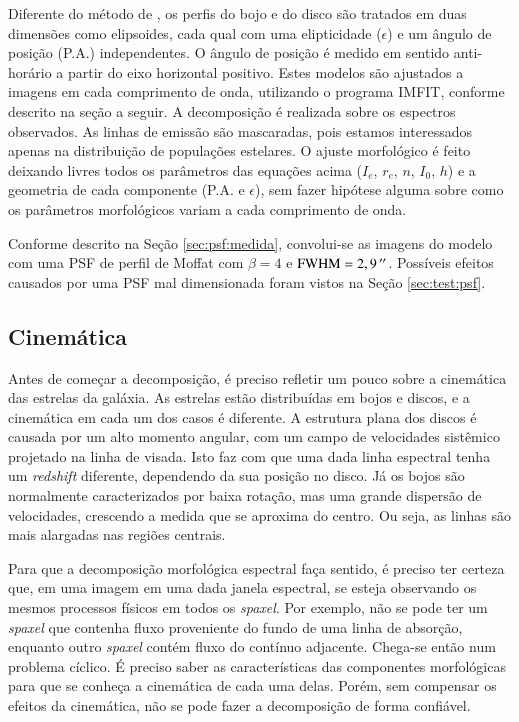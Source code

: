 Diferente do método de \citeauthor{Johnston2012}, os perfis do bojo e do disco
são tratados em duas dimensões como elipsoides, cada qual com uma elipticidade
($\epsilon$) e um ângulo de posição (P.A.) independentes. O ângulo de posição é
medido em sentido anti-horário a partir do eixo horizontal positivo. Estes
modelos são ajustados a imagens em cada comprimento de onda, utilizando o
programa IMFIT, conforme descrito na seção a seguir. A decomposição é realizada
sobre os espectros observados. As linhas de emissão são mascaradas, pois estamos
interessados apenas na distribuição de populações estelares.
O ajuste morfológico é feito deixando livres todos os parâmetros das equações
acima ($I_e$, $r_e$, $n$, $I_0$, $h$) e a geometria de cada componente (P.A. e
$\epsilon$), sem fazer hipótese alguma sobre como os parâmetros morfológicos
variam a cada comprimento de onda.

Conforme descrito na Seção \ref{sec:psf:medida}, convolui-se as imagens do
modelo com uma PSF de perfil de Moffat com $\beta=4$ e
$\mathrm{FWHM}=2,9\,^{\prime\prime}$. Possíveis efeitos causados por uma PSF mal
dimensionada foram vistos na Seção \ref{sec:test:psf}.





\subsection{Cinemática}
\label{sec:Decomp:cinematica}

Antes de começar a decomposição, é preciso refletir um pouco sobre a cinemática
das estrelas da galáxia. As estrelas estão distribuídas em bojos e discos, e a
cinemática em cada um dos casos é diferente.
A estrutura plana dos discos é causada por um alto momento angular, com um campo
de velocidades sistêmico projetado na linha de visada. Isto faz com que uma dada
linha espectral tenha um {\em redshift} diferente, dependendo da sua posição no
disco. Já os bojos são normalmente caracterizados por baixa rotação, mas uma
grande dispersão de velocidades, crescendo a medida que se aproxima do centro.
Ou seja, as linhas são mais alargadas nas regiões centrais.

Para que a decomposição morfológica espectral faça sentido, é preciso ter
certeza que, em uma imagem em uma dada janela espectral, se esteja observando os
mesmos processos físicos em todos os {\em spaxel}. Por exemplo, não se pode ter
um {\em spaxel} que contenha fluxo proveniente do fundo de uma linha de
absorção, enquanto outro {\em spaxel} contém fluxo do contínuo adjacente.
Chega-se então num problema cíclico. É preciso saber as características das
componentes morfológicas para que se conheça a cinemática de cada uma delas.
Porém, sem compensar os efeitos da cinemática, não se pode fazer a decomposição
de forma confiável.

